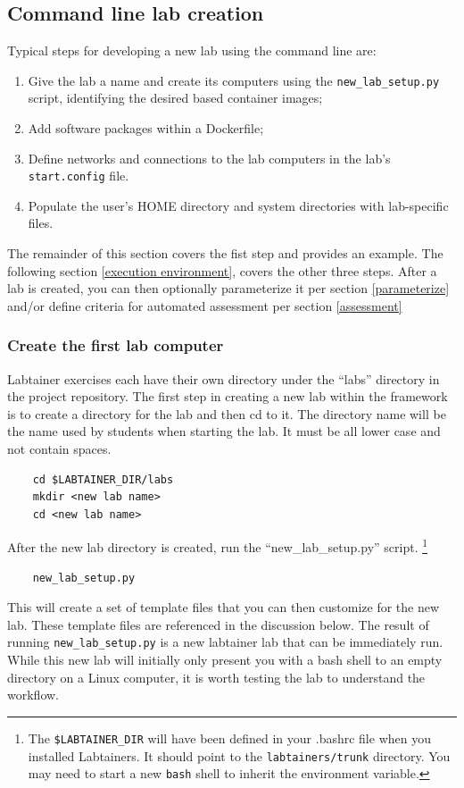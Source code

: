 \documentclass[12pt]{article}
\begin{document}
\subsection{Command line lab creation}
\label{command-line}
Typical steps for developing a new lab using the command line are:
\begin{enumerate}
\item Give the lab a name and create its computers using the {\tt new\_lab\_setup.py} script, identifying the
desired based container images;
\item Add software packages within a Dockerfile;
\item Define networks and connections to the lab computers in the lab's {\tt start.config} file.
\item Populate the user's HOME directory and system directories with lab-specific files.
\end{enumerate}
The remainder of this section covers the fist step and provides an example.  The 
following section \ref{execution environment}, covers the other three
steps.  After a lab is created, you can then optionally parameterize it per section \ref{parameterize} and/or
define criteria for automated assessment per section \ref{assessment}

\subsubsection{Create the first lab computer}
Labtainer exercises each have their own
directory under the ``labs'' directory in the project repository.
The first step in creating a new lab within the framework is to create
a directory for the lab and then cd to it.  The directory name will be the name
used by students when starting the lab.  It must be all lower case and not contain spaces.
\begin{verbatim}
    cd $LABTAINER_DIR/labs
    mkdir <new lab name>
    cd <new lab name>
\end{verbatim}

\noindent After the new lab directory is created, run the ``new\_lab\_setup.py'' script.
\footnote {The {\tt \$LABTAINER\_DIR} will have been defined in your .bashrc
file when you installed Labtainers.  It should point to the {\tt labtainers/trunk}
directory.  You may need to start a new {\tt bash} shell to inherit the environment
variable.}

\begin{verbatim}
    new_lab_setup.py
\end{verbatim}
This will create a set of template files that you can then customize
for the new lab.  These template files are referenced in the discussion
below.
The result of running {\tt new\_lab\_setup.py} is a new labtainer lab that can be immediately run.  
While this new lab will initially only present you with a bash shell to an
empty directory on a Linux computer, it is worth testing the lab to understand the workflow.
\end{document}
